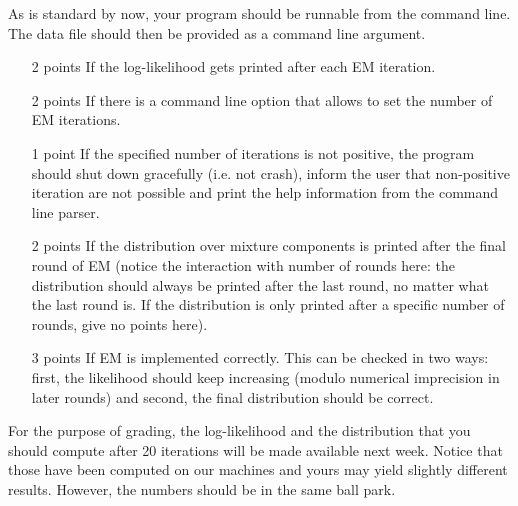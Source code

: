 \documentclass[11pt, leqno, a4paper]{article}
\begin{document}
As is standard by now, your program should be runnable from the command line. The data file should then
be provided as a command line argument.

\begin{itemize}
\item [2 points] If the log-likelihood gets printed after each EM iteration.
\item [2 points] If there is a command line option that allows to set the number of EM iterations.
\item [1 point]  If the specified number of iterations is not positive, the program should shut down gracefully (i.e. not crash), inform the user that non-positive iteration are not possible and print
the help information from the command line parser. 
\item [2 points] If the distribution over mixture components is printed after the final round of EM (notice
the interaction with number of rounds here: the distribution should always be printed after the last round, no matter what the last round is. If the distribution is only printed after a specific number of rounds,
give no points here).
\item[3 points] If EM is implemented correctly. This can be checked in two ways: first, the likelihood
should keep increasing (modulo numerical imprecision in later rounds) and second, the final distribution should be correct.
\end{itemize}

For the purpose of grading, the log-likelihood and the distribution that you should compute after 20 
iterations will be made available next week. Notice that those have been computed on our machines and
yours may yield slightly different results. However, the numbers should be in the same ball park.
\end{document}
